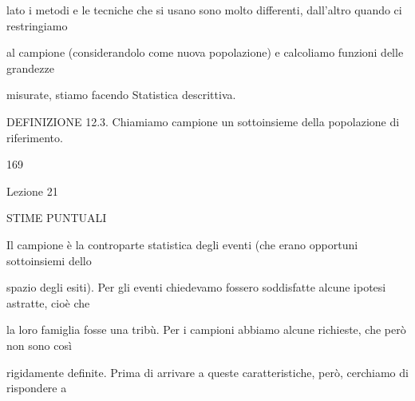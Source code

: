 \documentclass[a4paper,portrait,12pt]{article}
\begin{document}
\begin{flushleft}
lato i metodi e le tecniche che si usano sono molto differenti, dall'altro quando ci restringiamo
\end{flushleft}


\begin{flushleft}
al campione (considerandolo come nuova popolazione) e calcoliamo funzioni delle grandezze
\end{flushleft}


\begin{flushleft}
misurate, stiamo facendo Statistica descrittiva.
\end{flushleft}


\begin{flushleft}
DEFINIZIONE 12.3. Chiamiamo campione un sottoinsieme della popolazione di riferimento.
\end{flushleft}


169





\begin{flushleft}
Lezione 21
\end{flushleft}










\begin{flushleft}
STIME PUNTUALI
\end{flushleft}





\begin{flushleft}
Il campione \`{e} la controparte statistica degli eventi (che erano opportuni sottoinsiemi dello
\end{flushleft}


\begin{flushleft}
spazio degli esiti). Per gli eventi chiedevamo fossero soddisfatte alcune ipotesi astratte, cio\`{e} che
\end{flushleft}


\begin{flushleft}
la loro famiglia fosse una tribù. Per i campioni abbiamo alcune richieste, che per\`{o} non sono così
\end{flushleft}


\begin{flushleft}
rigidamente definite. Prima di arrivare a queste caratteristiche, per\`{o}, cerchiamo di rispondere a
\end{flushleft}
\end{document}

